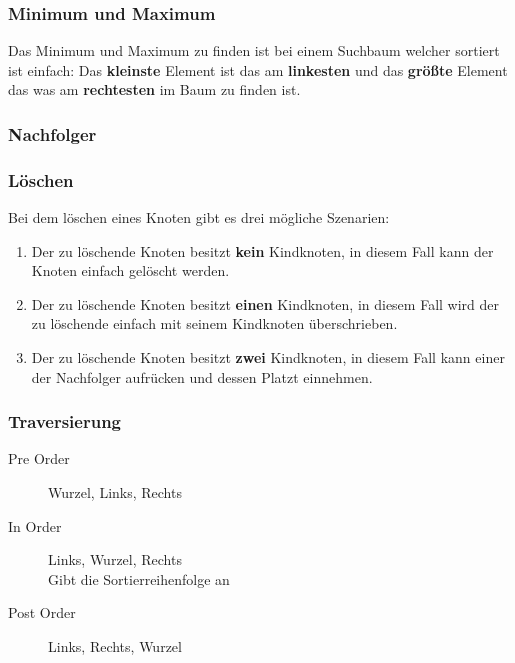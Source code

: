 \documentclass[10pt,a4paper]{article}
\begin{document}
\begin{multicols*}{4}
\subsubsection{Minimum und Maximum}
Das Minimum und Maximum zu finden ist bei einem Suchbaum welcher sortiert ist einfach: Das \textbf{kleinste} Element
ist das am \textbf{linkesten} und das \textbf{größte} Element das was am \textbf{rechtesten} im Baum zu finden ist.

\subsubsection{Nachfolger}


\subsubsection{Löschen}
Bei dem löschen eines Knoten gibt es drei mögliche Szenarien:
\begin{enumerate}
	\item Der zu löschende Knoten besitzt \textbf{kein} Kindknoten, in diesem Fall kann der Knoten einfach gelöscht
	      werden.
	\item Der zu löschende Knoten besitzt \textbf{einen} Kindknoten, in diesem Fall wird der zu löschende einfach
	      mit seinem Kindknoten überschrieben.
	\item Der zu löschende Knoten besitzt \textbf{zwei} Kindknoten, in diesem Fall kann einer der Nachfolger
	      aufrücken und dessen Platzt einnehmen.
\end{enumerate}

\subsubsection{Traversierung}
\begin{description}
	\item[Pre Order] Wurzel, Links, Rechts
	\item[In Order] Links, Wurzel, Rechts \\
	      Gibt die Sortierreihenfolge an
	\item[Post Order] Links, Rechts, Wurzel
\end{description}


\end{multicols*}
\end{document}
